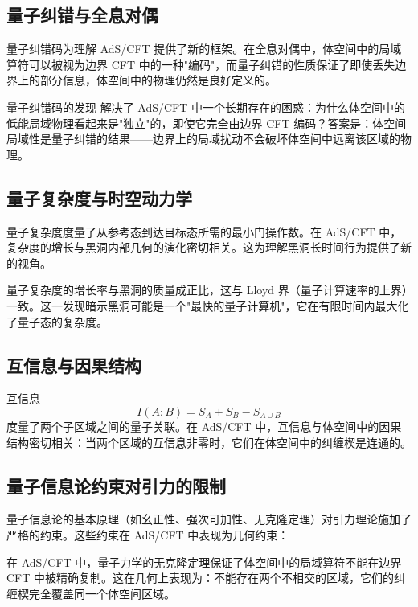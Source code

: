 \subsection{量子纠错与全息对偶}

量子纠错码为理解 AdS/CFT 提供了新的框架。在全息对偶中，体空间中的局域算符可以被视为边界 CFT 中的一种"编码"，而量子纠错的性质保证了即使丢失边界上的部分信息，体空间中的物理仍然是良好定义的。

\begin{remark}
量子纠错码的发现 \cite{Almheiri2015, Pastawski2015} 解决了 AdS/CFT 中一个长期存在的困惑：为什么体空间中的低能局域物理看起来是"独立"的，即使它完全由边界 CFT 编码？答案是：体空间局域性是量子纠错的结果——边界上的局域扰动不会破坏体空间中远离该区域的物理。
\end{remark}

\subsection{量子复杂度与时空动力学}

量子复杂度度量了从参考态到达目标态所需的最小门操作数。在 AdS/CFT 中，复杂度的增长与黑洞内部几何的演化密切相关。这为理解黑洞长时间行为提供了新的视角。

\begin{note}
量子复杂度的增长率与黑洞的质量成正比，这与 Lloyd 界（量子计算速率的上界）一致。这一发现暗示黑洞可能是一个"最快的量子计算机"，它在有限时间内最大化了量子态的复杂度。
\end{note}

\subsection{互信息与因果结构}

互信息
\begin{equation}
    I(A:B) = S_A + S_B - S_{A \cup B}
\end{equation}
度量了两个子区域之间的量子关联。在 AdS/CFT 中，互信息与体空间中的因果结构密切相关：当两个区域的互信息非零时，它们在体空间中的纠缠楔是连通的。

\subsection{量子信息论约束对引力的限制}

量子信息论的基本原理（如幺正性、强次可加性、无克隆定理）对引力理论施加了严格的约束。这些约束在 AdS/CFT 中表现为几何约束：

\begin{property}[无克隆定理的几何表述]
在 AdS/CFT 中，量子力学的无克隆定理保证了体空间中的局域算符不能在边界 CFT 中被精确复制。这在几何上表现为：不能存在两个不相交的区域，它们的纠缠楔完全覆盖同一个体空间区域。
\end{property}

